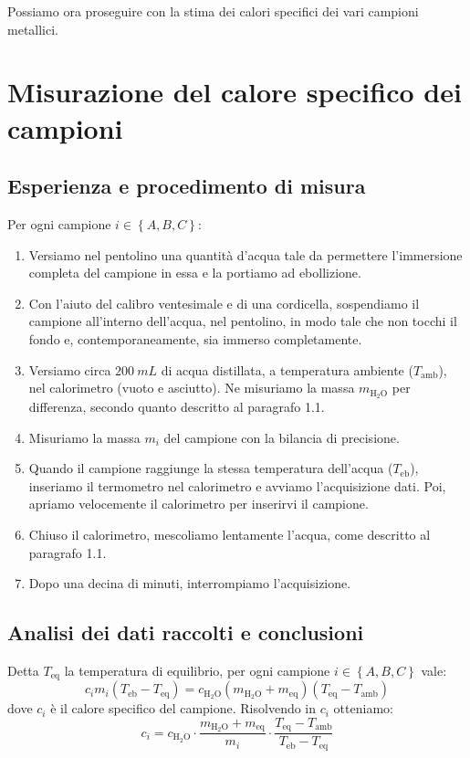 \documentclass{article}
\newcommand*{\acqua}{{\text{H}_2\text{O}}}
\begin{document}
Possiamo ora proseguire con la stima dei calori specifici dei vari campioni
metallici.

\pagebreak

\section{Misurazione del calore specifico dei campioni}

\subsection{Esperienza e procedimento di misura}

Per ogni campione $i\in\left\{A,B,C\right\}$:

\begin{enumerate}
    \item
        Versiamo nel pentolino una quantità d'acqua tale da permettere l'immersione
        completa del campione in essa e la portiamo ad ebollizione.
    \item
        Con l'aiuto del calibro ventesimale e di una cordicella, sospendiamo il
        campione all'interno dell'acqua, nel pentolino, in modo tale che non tocchi
        il fondo e, contemporaneamente, sia immerso completamente.
    \item
        Versiamo circa $\qty{200}{mL}$ di acqua distillata, a temperatura ambiente
        ($T_\text{amb}$), nel calorimetro (vuoto e asciutto).
        Ne misuriamo la massa $m_\acqua$ per differenza, secondo quanto descritto
        al paragrafo 1.1.
    \item
        Misuriamo la massa $m_i$ del campione con la bilancia di precisione.
    \item
        Quando il campione raggiunge la stessa temperatura dell'acqua ($T_\text{eb}$),
        inseriamo il termometro nel calorimetro e avviamo l'acquisizione dati.
        Poi, apriamo velocemente il calorimetro per inserirvi il campione.
    \item
        Chiuso il calorimetro, mescoliamo lentamente l'acqua,
        come descritto al paragrafo 1.1.
    \item
        Dopo una decina di minuti, interrompiamo l'acquisizione.
\end{enumerate}

\subsection{Analisi dei dati raccolti e conclusioni}
Detta $T_\text{eq}$ la temperatura di equilibrio, per ogni campione
$i\in\left\{A,B,C\right\}$ vale:
\[
    c_i m_i (T_\text{eb} - T_\text{eq}) =
    c_\acqua (m_\acqua + m_\text{eq}) (T_\text{eq} - T_\text{amb})
\]
dove $c_i$ è il calore specifico del campione. Risolvendo in $c_i$ otteniamo:
\[
    c_i = c_\acqua\cdot\frac{m_\acqua + m_\text{eq}}{m_i}
          \cdot\frac{T_\text{eq} - T_\text{amb}}{T_\text{eb} - T_\text{eq}}
\]
\end{document}
